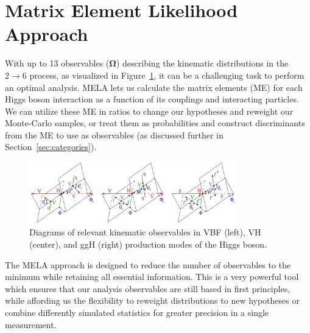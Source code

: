 
\section{Matrix Element Likelihood Approach} \label{sec:mela}

With up to 13 observables ($\boldsymbol{\Omega}$) describing the \Hboson kinematic distributions in the $2\to 6$ process, as visualized in Figure~\ref{fig:MELA}, it can be a challenging task to perform an optimal analysis. %
MELA lets us calculate the matrix elements (ME) for each Higgs boson interaction as a function of its couplings and interacting particles. We can utilize these ME in ratios to change our hypotheses and reweight our Monte-Carlo samples, or treat them as probabilities and construct discriminants from the ME to use as observables (as discussed further in Section~\ref{sec:categories}). 

\begin{figure}[!hbt]
\centering
\includegraphics[width=0.8\textwidth,clip] {figures/MELA.jpg}
\caption{Diagrams of relevant kinematic observables in VBF (left), VH (center), and ggH (right) production modes of the Higgs boson.}
\label{fig:MELA}
\end{figure}

The MELA approach is designed to reduce the number of observables to the minimum while retaining all essential information. This is a very powerful tool which ensures that our analysis observables are still based in first principles, while affording us the flexibility to reweight distributions to new hypotheses or combine differently simulated statistics for greater precision in a single measurement. 


